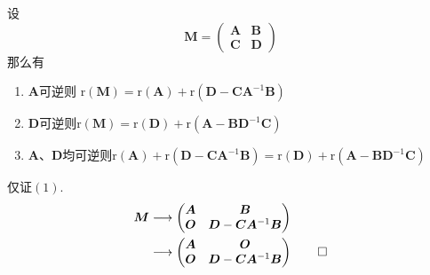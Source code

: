 \begin{formal}
\begin{theorem}[秩的降阶公式]\label{thm:秩的降阶公式}
    设
    \[
\bm{M} = \begin{pmatrix}
    \bm{A} & \bm{B} \\
    \bm{C} & \bm{D} 
\end{pmatrix}
\]
那么有
\begin{enumerate}[label=\textup{(\arabic*)}]
   \item $\bm{A}$可逆则
$\mathrm{r}\left(\bm{M}\right)
= \mathrm{r}\left(\bm{A}\right)
+ \mathrm{r}\left(
    \bm{D} - \bm{C}\bm{A}^{-1}
    \bm{B}
\right) $
\item $\bm{D}$可逆则$
\mathrm{r}\left(\bm{M}\right)
=\mathrm{r}\left(\bm{D}\right)
+\mathrm{r}\left(
    \bm{A}-
    \bm{B}\bm{D}^{-1}\bm{C}
\right)$
\item $\bm{A}$、$\bm{D}$均可逆则$
\mathrm{r}\left(\bm{A}\right)
+ \mathrm{r}\left(
    \bm{D} - \bm{C}\bm{A}^{-1}
    \bm{B}
\right)=
\mathrm{r}\left(\bm{D}\right)
+\mathrm{r}\left(
    \bm{A}-
    \bm{B}\bm{D}^{-1}\bm{C}
\right)$
\end{enumerate}
\end{theorem}
\begin{Proof}
仅证$(1)$.
\begin{align*}
    \bm{M}&\longrightarrow\begin{pmatrix}
        \bm{A}&\bm{B}
        \\
        \bm{O}&\bm{D}-\bm{CA}^{-1}\bm{B}
    \end{pmatrix}
    \\
    &\longrightarrow
    \begin{pmatrix}
        \bm{A}&\bm{O}\\
        \bm{O}&\bm{D}-\bm{CA}^{-1}\bm{B}
    \end{pmatrix}\qedhere
\end{align*}
\end{Proof}
\end{formal}

